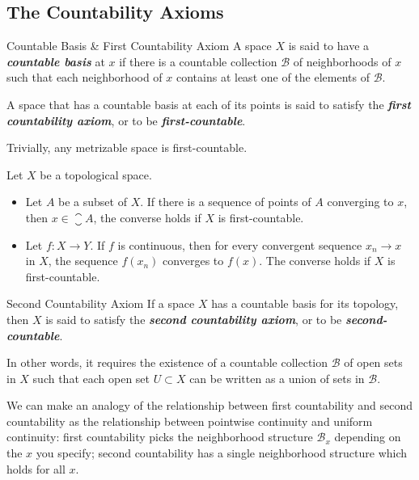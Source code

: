 \documentclass[12pt,a4paper]{article}
\begin{document}
    \subsection{The Countability Axioms}
    \begin{defi}{Countable Basis \& First Countability Axiom}
        A space $X$ is said to have a \textbf{\textit{countable basis}} at $x$ if there is a countable collection $\mathcal{B}$ of neighborhoods of $x$ such that each neighborhood of $x$ contains at least one of the elements of $\mathcal{B}$.

        A space that has a countable basis at each of its points is said to satisfy the \textbf{\textit{first countability axiom}}, or to be \textit{\textbf{first-countable}}.
    \end{defi}
    \begin{remark}
        Trivially, any metrizable space is first-countable.
    \end{remark}
    \hfill

    \begin{thm}
        Let $X$ be a topological space.
        \begin{itemize}
            \item Let $A$ be a subset of $X$. If there is a sequence of points of $A$ converging to $x$, then $x\in\closure{A}$, the converse holds if $X$ is first-countable.
            \item Let $f:X\to Y$. If $f$ is continuous, then for every convergent sequence $x_n\to x$ in $X$, the sequence $f(x_n)$ converges to $f(x)$. The converse holds if $X$ is first-countable.
        \end{itemize}
    \end{thm}
    \hfill

    \begin{defi}{Second Countability Axiom}
        If a space $X$ has a countable basis for its topology, then $X$ is said to satisfy the \textbf{\textit{second countability axiom}}, or to be \textbf{\textit{second-countable}}.
    \end{defi}
    \begin{remark}
        In other words, it requires the existence of a countable collection $\mathcal{B}$ of open sets in $X$ such that each open set $U\subset X$ can be written as a union of sets in $\mathcal{B}$.
    \end{remark}
    \begin{remark}
        We can make an analogy of the relationship between first countability and second countability as the relationship between pointwise continuity and uniform continuity: first countability picks the neighborhood structure $\mathcal{B}_x$ depending on the $x$ you specify; second countability has a single neighborhood structure which holds for all $x$.
    \end{remark}
\end{document}
